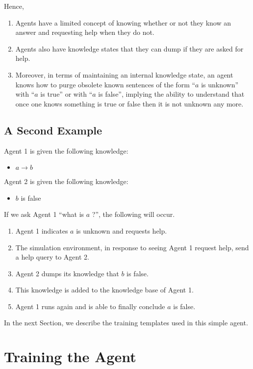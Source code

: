\documentclass{article}
\begin{document}
Hence,
\begin{enumerate}
\item Agents have a limited concept of knowing whether or not they know
an answer and requesting help when they do not.
\item Agents also have knowledge
states that they can dump if they are asked for help.
\item Moreover, in terms of maintaining an internal knowledge state, an agent
knows how to purge obsolete known sentences of the form ``$a$ is unknown''
with ``$a$ is true'' or with  ``$a$ is false'', implying the ability to
understand that once one knows something is true or false then it is not
unknown any more.
\end{enumerate}

\subsection{A Second Example}
\label{example_2}
Agent 1 is given the following knowledge:

\begin{itemize}
\item $a \rightarrow b$
\end{itemize}

Agent 2 is given the following knowledge:

\begin{itemize}
\item $b$ is false
\end{itemize}

If we ask Agent 1 ``what is $a$ ?'', the following will occur.

\begin{enumerate}
\item Agent 1 indicates $a$ is unknown and requests help.
\item The simulation environment, in response to seeing Agent 1
request help, send a help query to Agent 2.
\item Agent 2 dumps its knowledge that $b$ is false.
\item This knowledge is added to the knowledge base of Agent 1.
\item Agent 1 runs again and is able to finally conclude $a$ is false.
\end{enumerate}

In the next Section, we describe the training templates used in this
simple agent.


\section{Training the Agent}
\end{document}
